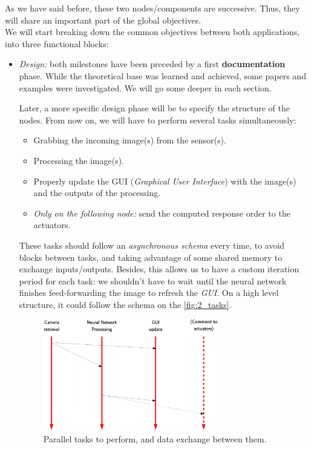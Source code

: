 As we have said before, these two nodes/components are successive. Thus, they will share an important part of the global objectives.\\

We will start breaking down the common objectives between both applications, into three functional blocks:

\begin{itemize}
	\item \textit{Design:} both milestones have been preceded by a first \textbf{documentation} phase. While the theoretical base was learned and achieved, some papers and examples were investigated. We will go some deeper in each section.
	
	Later, a more specific design phase will be to specify the structure of the nodes.
	From now on, we will have to perform several tasks simultaneously:
	\begin{itemize}
		\item Grabbing the incoming image(s) from the sensor(s).
		\item Processing the image(s).
		\item Properly update the GUI (\textit{Graphical User Interface}) with the image(s) and the outputs of the processing.
		\item \textit{Only on the following node:} send the computed response order to the actuators.
	\end{itemize}
	These tasks should follow an \emph{asynchronous schema} every time, to avoid blocks between tasks, and taking advantage of some shared memory to exchange inputs/outputs. Besides, this allows us to have a custom iteration period for each task: we shouldn't have to wait until the neural network finishes feed-forwarding the image to refresh the \emph{GUI}. On a high level structure, it could follow the schema on the \autoref{fig:2_tasks}.
	
	\begin{figure}[h]
		\centering
		\includegraphics[width=3in]{images/tasks_threads}
		\caption{Parallel tasks to perform, and data exchange between them.}
		\label{fig:2_tasks}
	\end{figure}
	

\end{itemize}
